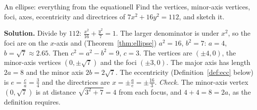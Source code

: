 \documentclass[11pt]{article}
\begin{document}
\begin{exmp}{An ellipse: everything from the equation}{ell}
Find the vertices, minor-axis vertices, foci, axes, eccentricity and directrices of $7x^2+16y^2=112$, and sketch it.

\textbf{Solution.} Divide by $112$: $\frac{x^2}{16}+\frac{y^2}7=1$. The larger denominator is under $x^2$, so the foci are on the $x$-axis and (Theorem~\ref{thm:ellipse}) $a^2=16$, $b^2=7$: $a=4$, $b=\sqrt7\approx2.65$. Then $c^2=a^2-b^2=9$, $c=3$. The vertices are $(\pm4,0)$, the minor-axis vertices $(0,\pm\sqrt7)$ and the foci $(\pm3,0)$. The major axis has length $2a=8$ and the minor axis $2b=2\sqrt7$. The eccentricity (Definition~\ref{def:ecc} below) is $e=\frac ca=\frac34$ and the directrices are $x=\pm\frac ae=\pm\frac{16}3$.
\emph{Check.} The minor-axis vertex $\left(0,\sqrt7\right)$ is at distance $\sqrt{3^2+7}=4$ from each focus, and $4+4=8=2a$, as the definition requires.


\end{exmp}
\end{document}
